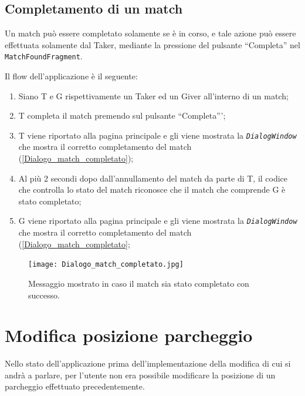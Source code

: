 \hypertarget{completamento-di-un-match}{%
\subsection{Completamento di un match}\label{completamento-di-un-match}}

Un match può essere completato solamente se è in corso, e tale azione può essere effettuata solamente dal Taker, mediante la pressione del pulsante ``Completa'' nel \texttt{MatchFoundFragment}.

Il flow dell'applicazione è il seguente:

\begin{enumerate}

    \item Siano T e G rispettivamente un Taker ed un Giver all'interno di un match;
    \item T completa il match premendo sul pulsante ``Completa''';
    \item T viene riportato alla pagina principale e gli viene mostrata la \emph{\texttt{DialogWindow}} che mostra il corretto completamento del match (\autoref{Dialogo_match_completato});
    \item Al più 2 secondi dopo dall'annullamento del match da parte di T, il codice che controlla lo stato del match riconosce che il match che comprende G è stato completato;
    \item G viene riportato alla pagina principale e gli viene mostrata la \emph{\texttt{DialogWindow}} che mostra il corretto completamento del match (\autoref{Dialogo_match_completato};
\end{enumerate}

\begin{figure}[H]
\centering
\texttt{[image: Dialogo\_match\_completato.jpg]}
\caption{Messaggio mostrato in caso il match sia stato completato con successo.}
\label{Dialogo_match_completato}
\end{figure}

\hypertarget{modificare-posizione-parcheggio}{%
\section{Modifica posizione parcheggio}\label{modificare-posizione-parcheggio}}

Nello stato dell'applicazione prima dell'implementazione della modifica di cui si andrà a parlare, per l'utente non era possibile modificare la posizione di un parcheggio effettuato precedentemente.

